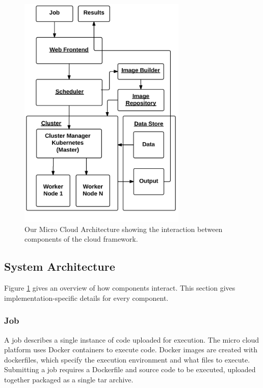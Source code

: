 \documentclass{sig-alternate-05-2015}
\begin{document}
\begin{figure}[h]
\includegraphics[width=8cm]{img/microcloud_architecture}
\caption{Our Micro Cloud Architecture showing the interaction between components of the cloud framework.}
\label{fig:architecture}
\end{figure}

\subsection{System Architecture}
Figure \ref{fig:architecture} gives an overview of how components interact. This section gives implementation-specific details for every component.

\subsubsection{Job}
A job describes a single instance of code uploaded for execution. 
The micro cloud platform uses Docker containers to execute code. Docker images are created with dockerfiles, which specify the execution environment and what files to execute. Submitting a job requires a Dockerfile and source code to be executed, uploaded together packaged as a single tar archive.  
\end{document}
